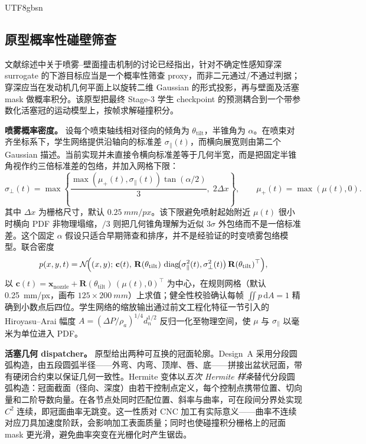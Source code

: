 \documentclass[english, 12pt, a4paper, elec, utf8, a-2b, online]{aaltothesis}
\begin{document}
\begin{CJK*}{UTF8}{gbsn}
\subsection{原型概率性碰壁筛查}

文献综述中关于喷雾--壁面撞击机制的讨论已经指出，针对不确定性感知穿深 surrogate 的下游目标应当是一个概率性筛查 proxy，而非二元通过/不通过判据；穿深应当在发动机几何平面上以旋转二维 Gaussian 的形式投影，再与壁面及活塞 mask 做概率积分。该原型把最终 Stage-3 学生 checkpoint 的预测耦合到一个带参数化活塞冠的运动模型上，按帧求解碰撞积分。

\textbf{喷雾概率密度。}  设每个喷束轴线相对径向的倾角为 $\theta_{\mathrm{tilt}}$，半锥角为 $\alpha$。在喷束对齐坐标系下，学生网络提供沿轴向的标准差 $\sigma_{\parallel}(t)$，而横向展宽则由第二个 Gaussian 描述。当前实现并未直接令横向标准差等于几何半宽，而是把固定半锥角视作约三倍标准差的包络，并加入网格下限：
\[
\sigma_{\perp}(t)
=\max\!\left\{
\frac{\max\!\left(\mu_{+}(t),\sigma_{\parallel}(t)\right)\tan(\alpha/2)}{3},
\;2\Delta x
\right\},\qquad
\mu_{+}(t)=\max(\mu(t),0).
\]
其中 \(\Delta x\) 为栅格尺寸，默认 \(\SI{0.25}{mm/px}\)。该下限避免喷射起始附近 \(\mu(t)\) 很小时横向 PDF 非物理塌缩，\(/3\) 则把几何锥角理解为近似 \(3\sigma\) 外包络而不是一倍标准差。这个固定 \(\alpha\) 假设只适合早期筛查和排序，并不是经验证的时变喷雾包络模型。联合密度
\[
p(x,y,t)=\mathcal{N}\!\Bigl((x,y);\,\mathbf{c}(t),\,\mathbf{R}(\theta_{\mathrm{tilt}})\,\operatorname{diag}\!\bigl(\sigma_{\parallel}^{2}(t),\sigma_{\perp}^{2}(t)\bigr)\,\mathbf{R}(\theta_{\mathrm{tilt}})^{\top}\Bigr),
\]
以 $\mathbf{c}(t)=\mathbf{x}_{\mathrm{nozzle}}+\mathbf{R}(\theta_{\mathrm{tilt}})\,(\mu(t),0)^{\top}$ 为中心，在规则网格（默认 \SI{0.25}{mm/px}，画布 $125\times\SI{200}{mm}$）上求值；健全性校验确认每帧 $\iint p\,\mathrm{d}A=1$ 精确到小数点后四位。学生网络的缩放输出通过前文工程化特征一节引入的 Hiroyasu--Arai 幅度 $A=(\Delta P/\rho_a)^{1/4}d_n^{1/2}$ 反归一化至物理空间，使 $\mu$ 与 $\sigma_{\parallel}$ 以毫米为单位进入 PDF。

\textbf{活塞几何 dispatcher。}  原型给出两种可互换的冠面轮廓。Design~A 采用分段圆弧构造，由五段圆弧半径——外弯、内弯、顶岸、唇、底——拼接出盆状冠面，带有硬闭合约束以保证几何一致性。Hermite 变体以\emph{五次 Hermite 样条}替代分段圆弧构造：冠面截面（径向、深度）由若干控制点定义，每个控制点携带位置、切向量和二阶导数向量。在各节点处同时匹配位置、斜率与曲率，可在段间分界处实现 $C^{2}$ 连续，即冠面曲率无跳变。这一性质对 CNC 加工有实际意义——曲率不连续对应刀具加速度阶跃，会影响加工表面质量；同时也使碰撞积分栅格上的冠面 mask 更光滑，避免曲率突变在光栅化时产生锯齿。


\end{CJK*}
\end{document}
